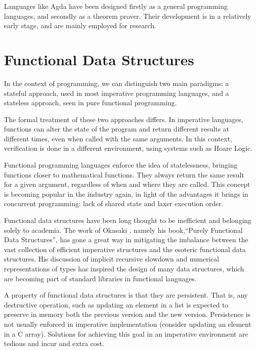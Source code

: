\documentclass[12pt,twoside,notitlepage]{report}
\begin{document}
Languages like Agda\cite{agdatutorial} have been designed firstly as a general programming languages, and secondly as a theorem prover. Their development is in a relatively early stage, and are mainly employed for research. 

\section{Functional Data Structures}

In the context of programming, we can distinguish two main paradigms: a stateful approach, used in most imperative programming languages, and a stateless approach, seen in pure functional programming.

The formal treatment of these two approaches differs. In imperative languages, functions can alter the state of the program and return different results at different times, even when called with the same arguments. In this context, verification is done in a different environment, using systems such as Hoare Logic.

Functional programming languages enforce the idea of statelessness, bringing functions closer to mathematical functions. They always return the same result for a given argument, regardless of when and where they are called. This concept is becoming popular in the industry again, in light of the advantages it brings in concurrent programming: lack of shared state and laxer execution order.
 
Functional data structures have been long thought to be inefficient and belonging solely to academia. The work of Okasaki \cite{okasaki}, namely his book,“Purely Functional Data Structures”, has gone a great way in mitigating the imbalance between the vast collection of efficient imperative structures and the esoteric functional data structures. His discussion of implicit recursive slowdown and numerical representations of types has inspired the design of many data structures, which are becoming part of standard libraries in functional languages.

A property of functional data structures is that they are persistent. That is, any destructive operation, such as updating an element in a list is expected to preserve in memory both the previous version and the new version. Persistence is not usually enforced in imperative implementation (consider updating an element in a C array). Solutions for achieving this goal in an imperative environment are tedious and incur and extra cost. 
\end{document}
